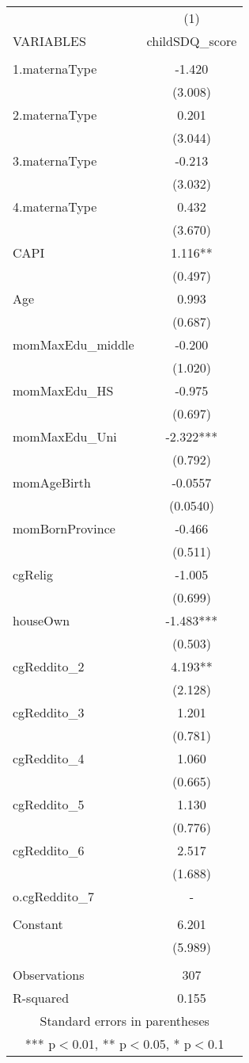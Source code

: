 \begin{tabular}{lc} \hline
 & (1) \\
VARIABLES & childSDQ\_score \\ \hline
 &  \\
1.maternaType & -1.420 \\
 & (3.008) \\
2.maternaType & 0.201 \\
 & (3.044) \\
3.maternaType & -0.213 \\
 & (3.032) \\
4.maternaType & 0.432 \\
 & (3.670) \\
CAPI & 1.116** \\
 & (0.497) \\
Age & 0.993 \\
 & (0.687) \\
momMaxEdu\_middle & -0.200 \\
 & (1.020) \\
momMaxEdu\_HS & -0.975 \\
 & (0.697) \\
momMaxEdu\_Uni & -2.322*** \\
 & (0.792) \\
momAgeBirth & -0.0557 \\
 & (0.0540) \\
momBornProvince & -0.466 \\
 & (0.511) \\
cgRelig & -1.005 \\
 & (0.699) \\
houseOwn & -1.483*** \\
 & (0.503) \\
cgReddito\_2 & 4.193** \\
 & (2.128) \\
cgReddito\_3 & 1.201 \\
 & (0.781) \\
cgReddito\_4 & 1.060 \\
 & (0.665) \\
cgReddito\_5 & 1.130 \\
 & (0.776) \\
cgReddito\_6 & 2.517 \\
 & (1.688) \\
o.cgReddito\_7 & - \\
 &  \\
Constant & 6.201 \\
 & (5.989) \\
 &  \\
Observations & 307 \\
 R-squared & 0.155 \\ \hline
\multicolumn{2}{c}{ Standard errors in parentheses} \\
\multicolumn{2}{c}{ *** p$<$0.01, ** p$<$0.05, * p$<$0.1} \\
\end{tabular}
